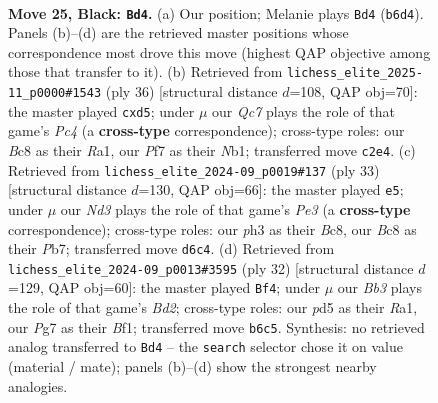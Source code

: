 \documentclass[11pt]{article}
\begin{document}
\begin{figure}[p]\centering
\begin{subfigure}{0.46\textwidth}\centering
\resizebox{\linewidth}{!}{%
\newchessgame
\chessboard[
  setfen={r1b5/pppp1ppk/1b1n3p/3P4/6BQ/2N2P1P/PPq3P1/R1B2K2 b - - 3 25},
  showmover=false,
  pgfstyle=straightmove, color=movearrow, markmove={b6-d4}
]}
\caption{}
\end{subfigure}\hfill
\begin{subfigure}{0.46\textwidth}\centering
\resizebox{\linewidth}{!}{%
\newchessgame
\chessboard[
  setfen={4r1k1/3q1ppp/p1p3b1/1p1nb3/2P5/1B1P1Q1P/PP1B1PP1/RN4K1 w - - 1 19},
  showmover=false,
  pgfstyle=straightmove, color=movearrow, markmove={c4-d5}
]}
\caption{}
\end{subfigure}
\\[4pt]
\begin{subfigure}{0.46\textwidth}\centering
\resizebox{\linewidth}{!}{%
\newchessgame
\chessboard[
  setfen={r1b3k1/pp4p1/2p1p2p/2bn4/2BNn2q/2P2Q2/PP4PP/RNB4K b - - 2 17},
  showmover=false,
  pgfstyle=straightmove, color=movearrow, markmove={e6-e5}
]}
\caption{}
\end{subfigure}\hfill
\begin{subfigure}{0.46\textwidth}\centering
\resizebox{\linewidth}{!}{%
\newchessgame
\chessboard[
  setfen={rn2k2r/pp3ppp/b1p1p3/4q2P/1Q4P1/2P2P2/P2BP3/R3KB1R w KQkq - 4 17},
  showmover=false,
  pgfstyle=straightmove, color=movearrow, markmove={d2-f4}
]}
\caption{}
\end{subfigure}
\caption{\textbf{Move 25, Black: \texttt{Bd4}.} (a) Our position; Melanie plays \texttt{Bd4} (\texttt{b6d4}). Panels (b)--(d) are the retrieved master positions whose correspondence most drove this move (highest QAP objective among those that transfer to it). (b) Retrieved from \texttt{lichess\_elite\_2025-11\_p0000\#1543} (ply 36) [structural distance $d$=108, QAP obj=70]: the master played \texttt{cxd5}; under $\mu$ our \emph{Qc7} plays the role of that game's \emph{Pc4} (a \textbf{cross-type} correspondence); cross-type roles: our \emph{B}c8 as their \emph{R}a1, our \emph{P}f7 as their \emph{N}b1; transferred move \texttt{c2e4}. (c) Retrieved from \texttt{lichess\_elite\_2024-09\_p0019\#137} (ply 33) [structural distance $d$=130, QAP obj=66]: the master played \texttt{e5}; under $\mu$ our \emph{Nd3} plays the role of that game's \emph{Pe3} (a \textbf{cross-type} correspondence); cross-type roles: our \emph{p}h3 as their \emph{B}c8, our \emph{B}c8 as their \emph{P}b7; transferred move \texttt{d6c4}. (d) Retrieved from \texttt{lichess\_elite\_2024-09\_p0013\#3595} (ply 32) [structural distance $d$=129, QAP obj=60]: the master played \texttt{Bf4}; under $\mu$ our \emph{Bb3} plays the role of that game's \emph{Bd2}; cross-type roles: our \emph{p}d5 as their \emph{R}a1, our \emph{P}g7 as their \emph{B}f1; transferred move \texttt{b6c5}. Synthesis: no retrieved analog transferred to \texttt{Bd4} -- the \texttt{search} selector chose it on value (material / mate); panels (b)--(d) show the strongest nearby analogies.}
\label{fig:thought-m49}
\end{figure}
\end{document}

